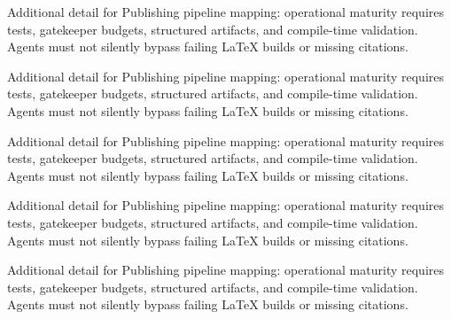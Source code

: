 Additional detail for Publishing pipeline mapping: operational maturity requires tests, gatekeeper budgets, structured artifacts, and compile-time validation. Agents must not silently bypass failing LaTeX builds or missing citations. \cite{crewai2024} \cite{langgraph2024}

Additional detail for Publishing pipeline mapping: operational maturity requires tests, gatekeeper budgets, structured artifacts, and compile-time validation. Agents must not silently bypass failing LaTeX builds or missing citations. \cite{crewai2024} \cite{langgraph2024}

Additional detail for Publishing pipeline mapping: operational maturity requires tests, gatekeeper budgets, structured artifacts, and compile-time validation. Agents must not silently bypass failing LaTeX builds or missing citations. \cite{crewai2024} \cite{langgraph2024}

Additional detail for Publishing pipeline mapping: operational maturity requires tests, gatekeeper budgets, structured artifacts, and compile-time validation. Agents must not silently bypass failing LaTeX builds or missing citations. \cite{crewai2024} \cite{langgraph2024}

Additional detail for Publishing pipeline mapping: operational maturity requires tests, gatekeeper budgets, structured artifacts, and compile-time validation. Agents must not silently bypass failing LaTeX builds or missing citations. \cite{crewai2024} \cite{langgraph2024}
